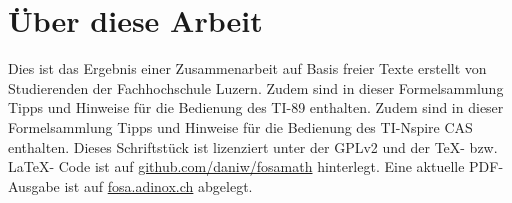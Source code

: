 \chapter*{Über diese Arbeit}
Dies ist das Ergebnis einer Zusammenarbeit auf Basis freier Texte erstellt von Studierenden der Fachhochschule Luzern. 
\ifti
Zudem sind in dieser Formelsammlung Tipps und Hinweise für die Bedienung des TI-89 enthalten. 
\fi
\ifnspire
Zudem sind in dieser Formelsammlung Tipps und Hinweise für die Bedienung des TI-Nspire CAS enthalten. 
\fi
Dieses Schriftstück ist lizenziert unter der GPLv2 und der \TeX-  bzw. \LaTeX- Code ist auf \url{github.com/daniw/fosamath} hinterlegt.
Eine aktuelle PDF-Ausgabe ist auf \url{fosa.adinox.ch} abgelegt. 
